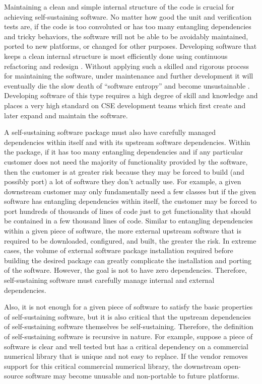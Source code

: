 \documentclass[11pt]{SANDreport}
\begin{document}
Maintaining a clean and simple internal structure of the code is crucial for achieving self-sustaining software.  No matter how good the unit and verification tests are, if the code is too convoluted or has too many entangling dependencies and tricky behaviors, the software will not be able to be avoidably maintained, ported to new platforms, or changed for other purposes.  Developing software that keeps a clean internal structure is most efficiently done using continuous refactoring and redesign {}\cite{XP2}.  Without applying such a skilled and rigorous process for maintaining the software, under maintenance and further development it will eventually die the slow death of ``software entropy'' and become unsustainable {}\cite{MythicalManMonth95}.  Developing software of this type requires a high degree of skill and knowledge and places a very high standard on CSE development teams which first create and later expand and maintain the software.

A self-sustaining software package must also have carefully managed dependencies within itself and with its upstream software dependencies.  Within the package, if it has too many entangling dependencies and if any particular customer does not need the majority of functionality provided by the software, then the customer is at greater risk because they may be forced to build (and possibly port) a lot of software they don't actually use.  For example, a given downstream customer may only fundamentally need a few classes but if the given software has entangling dependencies within itself, the customer may be forced to port hundreds of thousands of lines of code just to get functionality that should be contained in a few thousand lines of code.  Similar to entangling dependencies within a given piece of software, the more external upstream software that is required to be downloaded, configured, and built, the greater the risk.  In extreme cases, the volume of external software package installation required before building the desired package can greatly complicate the installation and porting of the software.  However, the goal is not to have zero dependencies.  Therefore, self-sustaining software must carefully manage internal and external dependencies.

Also, it is not enough for a given piece of software to satisfy the basic properties of self-sustaining software, but it is also critical that the upstream dependencies of self-sustaining software themselves be self-sustaining. Therefore, the definition of self-sustaining software is recursive in nature.  For example, suppose a piece of software is clear and well tested but has a critical dependency on a commercial numerical library that is unique and not easy to replace.  If the vendor removes support for this critical commercial numerical library, the downstream open-source software may become unusable and non-portable to future platforms.
\end{document}
